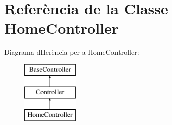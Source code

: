 \hypertarget{class_app_1_1_http_1_1_controllers_1_1_home_controller}{}\section{Referència de la Classe Home\+Controller}
\label{class_app_1_1_http_1_1_controllers_1_1_home_controller}
Diagrama d\textquotesingle{}Herència per a Home\+Controller\+:\begin{figure}[H]
\begin{center}
\leavevmode
\includegraphics[height=3.000000cm]{class_app_1_1_http_1_1_controllers_1_1_home_controller}
\end{center}
\end{figure}
